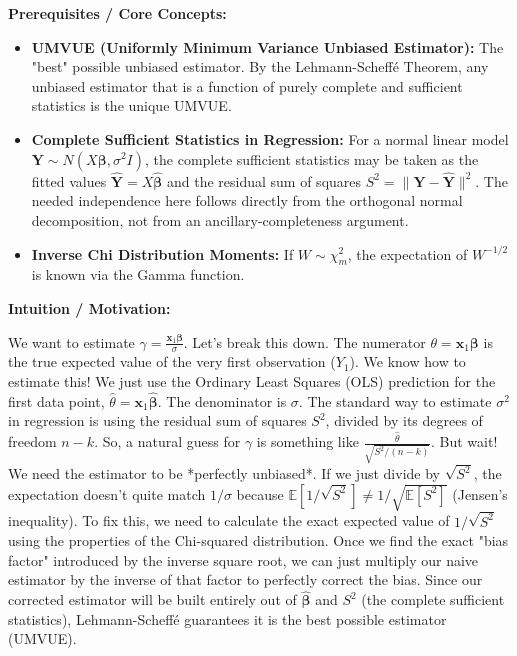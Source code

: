 \begin{solution}
\textbf{Prerequisites / Core Concepts:}
\begin{itemize}
    \item \textbf{UMVUE (Uniformly Minimum Variance Unbiased Estimator):} The "best" possible unbiased estimator. By the Lehmann-Scheffé Theorem, any unbiased estimator that is a function of purely complete and sufficient statistics is the unique UMVUE.
    \item \textbf{Complete Sufficient Statistics in Regression:} For a normal linear model $\mathbf{Y} \sim N(X\boldsymbol{\beta}, \sigma^2 I)$, the complete sufficient statistics may be taken as the fitted values $\hat{\mathbf{Y}} = X\hat{\boldsymbol{\beta}}$ and the residual sum of squares $S^2 = \|\mathbf{Y} - \hat{\mathbf{Y}}\|^2$. The needed independence here follows directly from the orthogonal normal decomposition, not from an ancillary-completeness argument.
    \item \textbf{Inverse Chi Distribution Moments:} If $W \sim \chi^2_m$, the expectation of $W^{-1/2}$ is known via the Gamma function.
\end{itemize}

\textbf{Intuition / Motivation:}

We want to estimate $\gamma = \frac{\mathbf{x}_1\boldsymbol{\beta}}{\sigma}$.
Let's break this down. The numerator $\theta = \mathbf{x}_1\boldsymbol{\beta}$ is the true expected value of the very first observation ($Y_1$). We know how to estimate this! We just use the Ordinary Least Squares (OLS) prediction for the first data point, $\hat{\theta} = \mathbf{x}_1\hat{\boldsymbol{\beta}}$.
The denominator is $\sigma$. The standard way to estimate $\sigma^2$ in regression is using the residual sum of squares $S^2$, divided by its degrees of freedom $n-k$.
So, a natural guess for $\gamma$ is something like $\frac{\hat{\theta}}{\sqrt{S^2/(n-k)}}$.
But wait! We need the estimator to be *perfectly unbiased*. If we just divide by $\sqrt{S^2}$, the expectation doesn't quite match $1/\sigma$ because $\mathbb{E}[1/\sqrt{S^2}] \neq 1/\sqrt{\mathbb{E}[S^2]}$ (Jensen's inequality).
To fix this, we need to calculate the exact expected value of $1/\sqrt{S^2}$ using the properties of the Chi-squared distribution. Once we find the exact "bias factor" introduced by the inverse square root, we can just multiply our naive estimator by the inverse of that factor to perfectly correct the bias. Since our corrected estimator will be built entirely out of $\hat{\boldsymbol{\beta}}$ and $S^2$ (the complete sufficient statistics), Lehmann-Scheffé guarantees it is the best possible estimator (UMVUE).


\end{solution}
